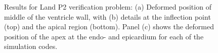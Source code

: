\begin{figure}[ht!]
{\label{fig:land2-3}}			
%
\caption{Results for Land P2 verification problem: (a) Deformed position of middle of the ventricle wall, with (b) details at the inflection point (top) and the apical region (bottom). Panel (c) shows the deformed position of the apex at the endo- and epicardium for each of the simulation codes.}
\label{fig:land2}
\end{figure}
\vfil
\begin{figure}[ht!]
\centering
{}		
\subfigure[]{%
}
\end{figure}
